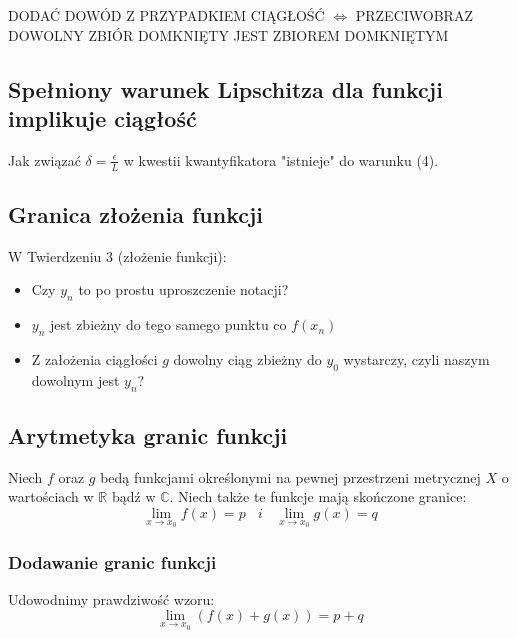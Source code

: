 \documentclass{article}
\begin{document}
\begin{center}
    DODAĆ DOWÓD Z PRZYPADKIEM CIĄGŁOŚĆ \(\iff\) PRZECIWOBRAZ DOWOLNY ZBIÓR DOMKNIĘTY JEST ZBIOREM DOMKNIĘTYM
\end{center}

\subsection{Spełniony warunek Lipschitza dla funkcji implikuje ciągłość}

Jak związać \(\delta = \frac{\epsilon}{L}\) w kwestii kwantyfikatora "istnieje" do warunku (4).

\subsection{Granica złożenia funkcji}

W Twierdzeniu 3 (złożenie funkcji):

\begin{itemize}
    \item Czy \(y_n\) to po prostu uproszczenie notacji?
    \item \(y_n\) jest zbieżny do tego samego punktu co \(f(x_n)\)
    \item Z założenia ciągłości \(g\) dowolny ciąg zbieżny do \(y_0\) wystarczy, czyli naszym dowolnym jest \(y_n\)?
\end{itemize}

\subsection{Arytmetyka granic funkcji}

Niech \(f\) oraz \(g\) bedą funkcjami określonymi na pewnej przestrzeni metrycznej \(X\) o wartościach
w \(\mathbb{R}\) bądź w \(\mathbb{C}\). Niech także te funkcje mają skończone granice:
\begin{equation*}
    \lim_{x \to x_0} f(x) = p \ \ \ \ i \ \ \ \ \lim_{x \to x_0} g(x) = q
\end{equation*}

\subsubsection{Dodawanie granic funkcji}

Udowodnimy prawdziwość wzoru:
\begin{equation*}
    \lim_{x \to x_0}(f(x) + g(x)) = p + q
\end{equation*}
\end{document}
